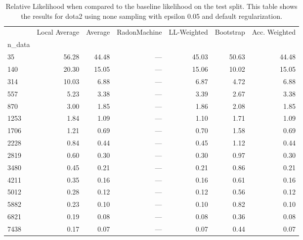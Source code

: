 \begin{table}
\centering
\caption{Relative Likelihood when compared to the baseline likelihood on the test split. This table shows the results for  dota2 using  none sampling with epsilon  0.05 and  default regularization.}
\label{tab:1}
\begin{tabular}{lrrrrrr}
\toprule
{} &  Local Average &  Average &  RadonMachine &  LL-Weighted &  Bootstrap &  Acc. Weighted \\
n\_data &                &          &               &              &            &                \\
\midrule
35     &          56.28 &    44.48 &           --- &        45.03 &      50.63 &          44.48 \\
140    &          20.30 &    15.05 &           --- &        15.06 &      10.02 &          15.05 \\
314    &          10.03 &     6.88 &           --- &         6.87 &       4.72 &           6.88 \\
557    &           5.23 &     3.38 &           --- &         3.39 &       2.67 &           3.38 \\
870    &           3.00 &     1.85 &           --- &         1.86 &       2.08 &           1.85 \\
1253   &           1.84 &     1.09 &           --- &         1.10 &       1.71 &           1.09 \\
1706   &           1.21 &     0.69 &           --- &         0.70 &       1.58 &           0.69 \\
2228   &           0.84 &     0.44 &           --- &         0.45 &       1.12 &           0.44 \\
2819   &           0.60 &     0.30 &           --- &         0.30 &       0.97 &           0.30 \\
3480   &           0.45 &     0.21 &           --- &         0.21 &       0.86 &           0.21 \\
4211   &           0.35 &     0.16 &           --- &         0.16 &       0.61 &           0.16 \\
5012   &           0.28 &     0.12 &           --- &         0.12 &       0.56 &           0.12 \\
5882   &           0.23 &     0.10 &           --- &         0.10 &       0.82 &           0.10 \\
6821   &           0.19 &     0.08 &           --- &         0.08 &       0.36 &           0.08 \\
7438   &           0.17 &     0.07 &           --- &         0.07 &       0.44 &           0.07 \\
\bottomrule
\end{tabular}
\end{table}

